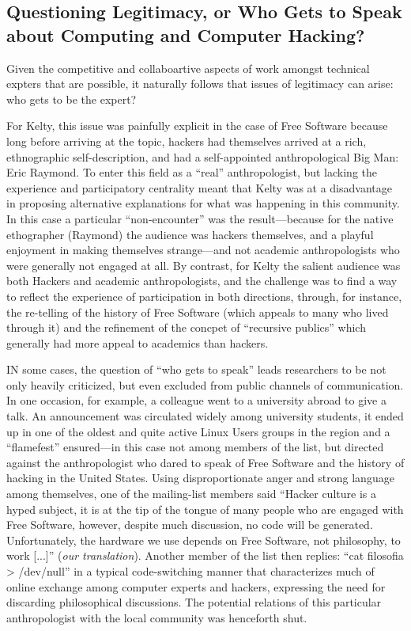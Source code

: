 \documentclass[10pt,letter,oneside]{scrartcl}
\begin{document}
\subsection{Questioning Legitimacy, or Who Gets to Speak about
    Computing and Computer Hacking?} 

Given the competitive and collaboartive aspects of work amongst
technical expters that are possible, it naturally follows that issues
of legitimacy can arise: who gets to be the expert?

For Kelty, this issue was painfully explicit in the case of Free
Software because long before arriving at the topic, hackers had
themselves arrived at a rich, ethnographic self-description, and had a
self-appointed anthropological Big Man: Eric Raymond.  To enter this
field as a ``real'' anthropologist, but lacking the experience and
participatory centrality meant that Kelty was at a disadvantage in
proposing alternative explanations for what was happening in this
community.  In this case a particular ``non-encounter'' was the
result---because for the native ethographer (Raymond) the audience was
hackers themselves, and a playful enjoyment in making themselves
strange---and not academic anthropologists who were generally not
engaged at all.  By contrast, for Kelty the salient audience was both
Hackers and academic anthropologists, and the challenge was to find a
way to reflect the experience of participation in both directions,
through, for instance, the re-telling of the history of Free Software
(which appeals to many who lived through it) and the refinement of the
concpet of ``recursive publics'' which generally had more appeal to
academics than hackers.   

IN some cases, the question of ``who gets to speak'' leads researchers
to be not only heavily criticized, but even excluded from public
channels of communication.  In one occasion, for example, a
colleague went to a university abroad to give a talk. An 
announcement was circulated widely among university students, it
ended up in one of the oldest and quite active Linux Users groups in
the region and a ``flamefest'' ensured---in this case not among members of
the list, but directed  against the anthropologist who dared to speak of Free
Software and the history of hacking in the United States. Using
disproportionate anger and strong language among themselves, one of
the mailing-list members said ``Hacker culture is a hyped subject, it
is at the tip of the tongue of many people who are engaged with Free
Software, however, despite much discussion, no code will be
generated. Unfortunately, the hardware we use depends on Free
Software, not philosophy, to work {[}...{]}'' (\emph{our
  translation}). Another member of the list then replies: ``cat
filosofia \textgreater{} /dev/null'' in a typical code-switching
manner that characterizes much of online exchange among computer
experts and hackers, expressing the need for discarding philosophical
discussions. The potential relations of this particular anthropologist
with the local community was henceforth shut.
\end{document}
